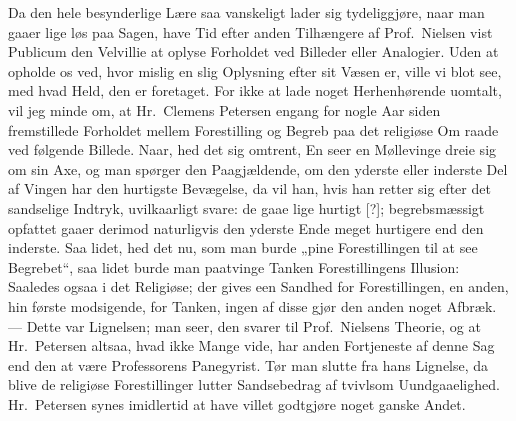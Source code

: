 Da den hele besynderlige Lære saa vanskeligt lader sig tydeliggjøre, naar man
gaaer lige løs paa Sagen, have Tid efter anden Tilhængere af Prof.\ Nielsen
vist Publicum den Velvillie at oplyse Forholdet ved Billeder eller Analogier.
Uden at opholde os ved, hvor mislig en slig Oplysning efter sit Væsen er,
ville vi blot see, med hvad Held, den er foretaget. For ikke at lade noget
Herhenhørende uomtalt, vil jeg minde om, at Hr.\ Clemens Petersen engang for
nogle Aar siden fremstillede Forholdet mellem Forestilling og Begreb paa det
religiøse Om%
raade ved følgende Billede. Naar, hed det sig omtrent, En seer en
Møllevinge dreie sig om sin Axe, og man spørger den Paagjældende, om den
yderste eller inderste Del af Vingen har den hurtigste Bevægelse, da vil han,
hvis han retter sig efter det sandselige Indtryk, uvilkaarligt svare: de gaae
lige hurtigt [?]; begrebsmæssigt opfattet gaaer derimod naturligvis den
yderste Ende meget hurtigere end den inderste. Saa lidet, hed det nu, som man
burde „pine Forestillingen til at see Begrebet“, saa lidet burde man
paatvinge Tanken Forestillingens Illusion: Saaledes ogsaa i det Religiøse;
der gives een Sandhed for Forestillingen, en anden, hin første modsigende,
for Tanken, ingen af disse gjør den anden noget Afbræk. --- Dette var
Lignelsen; man seer, den svarer til Prof.\ Nielsens Theorie, og at Hr.\
Petersen altsaa, hvad ikke Mange vide, har anden Fortjeneste af denne Sag end
den at være Professorens Panegyrist. Tør man slutte fra hans Lignelse, da
blive de religiøse Forestillinger lutter Sandsebedrag af tvivlsom
Uundgaaelighed. Hr.\ Petersen synes imidlertid at have villet godtgjøre noget
ganske Andet.

